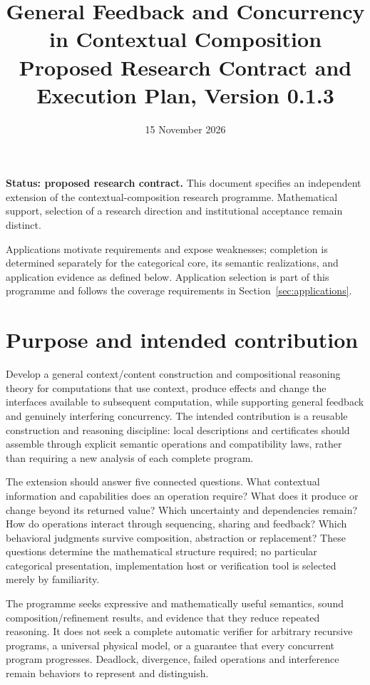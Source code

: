 \documentclass[11pt,a4paper]{article}
\title{General Feedback and Concurrency in Contextual Composition\\[5pt]\large Proposed Research Contract and Execution Plan, Version 0.1.3}
\author{}
\date{15 November 2026}
\begin{document}
\maketitle

\textbf{Status: proposed research contract.} This document specifies an independent extension of the contextual-composition research programme. Mathematical support, selection of a research direction and institutional acceptance remain distinct.

Applications motivate requirements and expose weaknesses; completion is determined separately for the categorical core, its semantic realizations, and application evidence as defined below. Application selection is part of this programme and follows the coverage requirements in Section~\ref{sec:applications}.

\section{Purpose and intended contribution}\label{sec:purpose}

Develop a general context/content construction and compositional reasoning theory for computations that use context, produce effects and change the interfaces available to subsequent computation, while supporting general feedback and genuinely interfering concurrency. The intended contribution is a reusable construction and reasoning discipline: local descriptions and certificates should assemble through explicit semantic operations and compatibility laws, rather than requiring a new analysis of each complete program.

The extension should answer five connected questions. What contextual information and capabilities does an operation require? What does it produce or change beyond its returned value? Which uncertainty and dependencies remain? How do operations interact through sequencing, sharing and feedback? Which behavioral judgments survive composition, abstraction or replacement? These questions determine the mathematical structure required; no particular categorical presentation, implementation host or verification tool is selected merely by familiarity.

The programme seeks expressive and mathematically useful semantics, sound composition/refinement results, and evidence that they reduce repeated reasoning. It does not seek a complete automatic verifier for arbitrary recursive programs, a universal physical model, or a guarantee that every concurrent program progresses. Deadlock, divergence, failed operations and interference remain behaviors to represent and distinguish.
\end{document}
